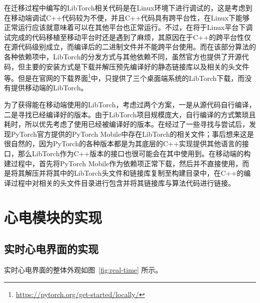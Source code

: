 在迁移过程中编写的LibTorch相关代码是在Linux环境下进行调试的，这是考虑到在移动端调试C++代码较为不便，并且C++代码具有跨平台性，在Linux下能够正常运行应该就意味着可以在其他平台也正常运行。不过，在将于Linux平台下调试完成的代码移植至移动平台时还是遇到了麻烦，其原因在于C++的跨平台性仅在源代码级别成立，而编译后的二进制文件并不能跨平台使用。而在该部分算法的各种依赖项中，LibTorch的分发方式与其他依赖不同，虽然官方也提供了开源代码，但主要的安装方式是下载并解压预先编译好的静态链接库以及相关的头文件等。但是在官网的下载界面\footnote{\url{https://pytorch.org/get-started/locally/}}中，只提供了三个桌面端系统的LibTorch下载，而没有提供移动端的LibTorch。

为了获得能在移动端使用的LibTorch，考虑过两个方案，一是从源代码自行编译，二是寻找已经编译好的版本。由于LibTorch项目规模庞大，自行编译的方式繁琐且耗时，所以优先考虑了使用已经被编译好的版本。在经过了一些寻找与尝试后，发现PyTorch官方提供的PyTorch Mobile中存在LibTorch的相关文件；事后想来这是很自然的，因为PyTorch的各种版本都是为其底层的C++实现提供其他语言的接口，那么LibTorch作为C++版本的接口也很可能会在其中使用到。在移动端的构建过程中，首先将PyTorch Mobile作为依赖项正常下载，然后并不直接使用，而是将其解压并将其中的LibTorch头文件和链接库复制至构建目录中，在C++的编译过程中对相关的头文件目录进行包含并将其链接库与算法代码进行链接。


\section{心电模块的实现}\label{sec:ecg}

\subsection{实时心电界面的实现}\label{subsec:real-time-ui}

实时心电界面的整体外观如图~\ref{fig:real-time} 所示。

